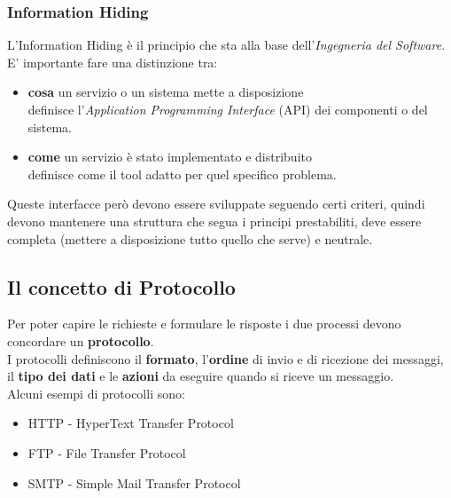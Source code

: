 \documentclass[12pt, a4paper]{article}
\begin{document}
    \subsubsection{Information Hiding}
    L'Information Hiding è il principio che sta alla base dell'\textit{Ingegneria del Software}.
    \\E' importante fare una distinzione tra:
    \begin{itemize}
        \item \textbf{cosa} un servizio o un sistema mette a disposizione
        \\definisce l'\textit{Application Programming Interface} (API) dei componenti o del sistema.
        \item \textbf{come} un servizio è stato implementato e distribuito
        \\definisce come il tool adatto per quel specifico problema.
    \end{itemize}
    
    Queste interfacce però devono essere sviluppate seguendo certi criteri, 
    quindi devono mantenere una struttura che segua i principi prestabiliti,
    deve essere completa (mettere a disposizione tutto quello che serve) e neutrale.

    \subsection{Il concetto di Protocollo}
    Per poter capire le richieste e formulare le risposte i due processi devono concordare
    un \textbf{protocollo}.
    \\I protocolli definiscono il \textbf{formato}, l'\textbf{ordine} di invio e di ricezione dei messaggi,
    il \textbf{tipo dei dati} e le \textbf{azioni} da eseguire quando si riceve un messaggio.
    \\Alcuni esempi di protocolli sono:
    \begin{itemize}
        \item HTTP - HyperText Transfer Protocol
        \item FTP - File Transfer Protocol
        \item SMTP - Simple Mail Transfer Protocol
    \end{itemize}
    
\end{document}
